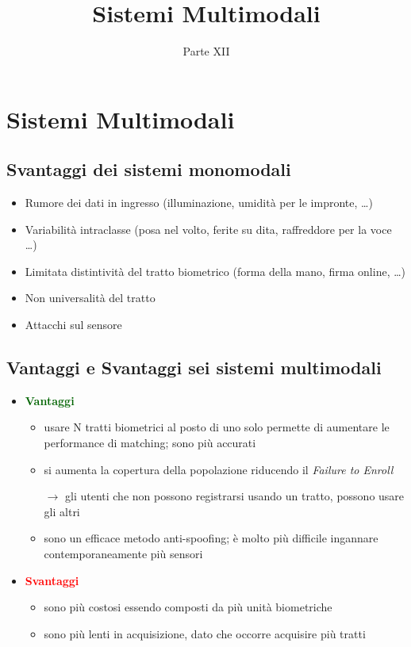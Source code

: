 \documentclass{report}
\title{Sistemi Multimodali}
\date{Parte XII}
\begin{document}
\maketitle

\tableofcontents
\newpage

\chapter{Sistemi Multimodali}

\section{Svantaggi dei sistemi monomodali}
\begin{itemize}
    \item Rumore dei dati in ingresso (illuminazione, umidità per le impronte, \dots)
    \item Variabilità intraclasse (posa nel volto, ferite su dita, raffreddore per la voce \dots)
    \item Limitata distintività del tratto biometrico (forma della mano, firma online, \dots)
    \item Non universalità del tratto
    \item Attacchi sul sensore
\end{itemize}

\section{Vantaggi e Svantaggi sei sistemi multimodali}

\begin{itemize}
    \item \textcolor{darkgreen}{\textbf{Vantaggi}}
    \begin{itemize}
        \item usare N tratti biometrici al posto di uno solo permette di aumentare 
        le performance di matching; sono più accurati
        \item si aumenta la copertura della popolazione riducendo il \textit{Failure to Enroll}
        
        $\rightarrow$ gli utenti che non possono registrarsi usando un tratto, possono usare gli altri
        \item sono un efficace metodo anti-spoofing; è molto più difficile ingannare contemporaneamente più sensori
    \end{itemize}
    \item \textcolor{red}{\textbf{Svantaggi}}
    \begin{itemize}
        \item sono più costosi essendo composti da più unità biometriche 
        \item sono più lenti in acquisizione, dato che occorre acquisire più tratti
    \end{itemize}
\end{itemize}
\end{document}
